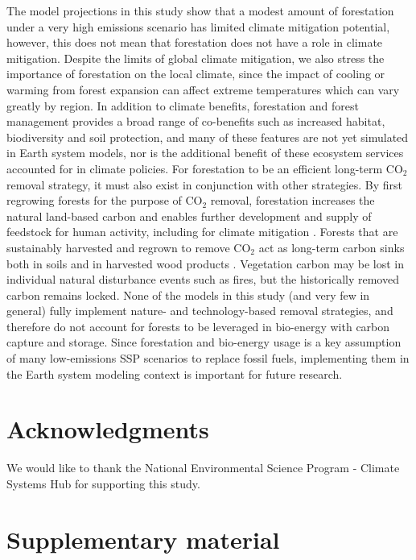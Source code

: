 \documentclass[]{article}
\begin{document}
The model projections in this study show that a modest amount of forestation under a very high emissions scenario has limited climate mitigation potential, however, this does not mean that forestation does not have a role in climate mitigation.
Despite the limits of global climate mitigation, we also stress the importance of forestation on
the local climate, since the impact of cooling or warming from forest expansion can affect extreme
temperatures which can vary greatly by region.
In addition to climate benefits, forestation and forest management provides a broad range of co-benefits such as increased habitat, biodiversity and soil protection, and many of these features are not yet simulated in Earth system models, nor is the additional benefit of these ecosystem services accounted for in climate policies.
For forestation to be an efficient long-term CO$_2$ removal strategy, it must also exist in conjunction with other strategies.
By first regrowing forests for the purpose of CO$_2$ removal, forestation increases the natural land-based carbon and enables further development and supply of feedstock for human activity, including for climate mitigation \parencite{geng_review_2017}.
Forests that are sustainably harvested and regrown to remove CO$_2$ act as long-term carbon sinks both in soils and in harvested wood products \parencite{schulze_climate_2020,soimakallio_trade-offs_2021}.
Vegetation carbon may be lost in individual natural disturbance events such as fires, but the historically removed carbon remains locked.
None of the models in this study (and very few in general) fully implement nature- and technology-based removal strategies, and therefore do not account for forests to be leveraged in bio-energy with carbon capture and storage.
Since forestation and bio-energy usage is a key assumption of many low-emissions SSP scenarios to replace fossil fuels, implementing them in the Earth system modeling context is important for future research.

\section{Acknowledgments}
We would like to thank the National Environmental Science Program - Climate Systems Hub for supporting this study.

\printbibliography

\section{Supplementary material}
\setcounter{figure}{0}
\end{document}
